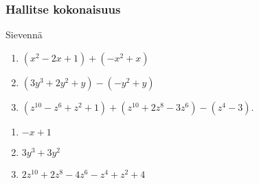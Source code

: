
\subsubsection*{Hallitse kokonaisuus}

\begin{tehtava}
    Sievennä
    \begin{enumerate}
        \item $(x^2 - 2x + 1) + (-x^2 + x) $
        \item $(3y^3 + 2y^2  + y) - (-y^2 + y)$
        \item $(z^{10} - z^6 + z^2 + 1) + (z^{10} + 2z^8 - 3z^6) - (z^4 - 3)$.
    \end{enumerate}
    \begin{vastaus}
        \begin{enumerate}
            \item $-x + 1$
            \item $3y^3 + 3y^2$
            \item $2z^{10} + 2z^8 - 4z^6 - z^4 + z^2 + 4$
        \end{enumerate}
    \end{vastaus}
\end{tehtava}

